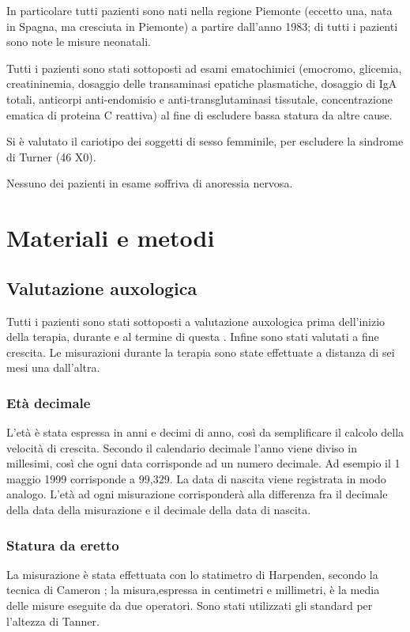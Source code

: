 In particolare tutti pazienti sono nati nella regione Piemonte (eccetto una, nata in Spagna, ma cresciuta in Piemonte) a partire dall'anno 1983; di tutti i pazienti sono note le misure neonatali.

Tutti i pazienti sono stati sottoposti ad esami ematochimici (emocromo, glicemia, creatininemia, dosaggio delle transaminasi epatiche plasmatiche, dosaggio di IgA totali, anticorpi anti-endomisio e anti-transglutaminasi tissutale, concentrazione ematica di proteina C reattiva) al fine di escludere bassa statura da altre cause. 

Si è valutato il cariotipo dei soggetti di sesso femminile, per escludere la sindrome di Turner (46 X0). 

Nessuno dei pazienti in esame soffriva di anoressia nervosa.


\section{Materiali e metodi}

\subsection{Valutazione auxologica}
Tutti i pazienti sono stati sottoposti a valutazione auxologica prima dell'inizio della terapia, durante e al termine di questa . Infine sono stati valutati a fine crescita. Le misurazioni durante la terapia sono state effettuate a distanza di sei mesi una dall'altra.

\subsubsection*{Età decimale}
L'età è stata espressa in anni e decimi di anno, così da semplificare il calcolo della velocità di crescita. Secondo il calendario decimale l'anno viene diviso in millesimi, così che ogni data corrisponde ad un numero decimale. Ad esempio il 1 maggio 1999 corrisponde a 99,329. La data di nascita viene registrata in modo analogo. L'età ad ogni misurazione corrisponderà alla differenza fra il decimale della data della misurazione e il decimale della data di nascita\cite{tanner1990foetus}.    


\subsubsection*{Statura da eretto}
 La misurazione è stata effettuata con lo statimetro di Harpenden, secondo la tecnica di Cameron\cite{cameron1984measurement}
; la misura,espressa in centimetri e millimetri, è la media delle misure eseguite da due operatori. Sono stati utilizzati gli standard per l'altezza di Tanner\cite{tanner1966standards}.

